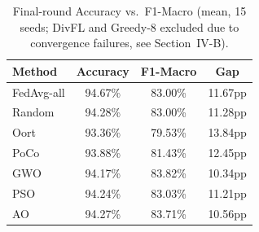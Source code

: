 \documentclass[conference]{IEEEtran}
\begin{document}
\begin{table}[t]
\centering
\caption{Final-round Accuracy vs.\ F1-Macro (mean, 15 seeds; DivFL and Greedy-8 excluded due to convergence failures, see Section~IV-B).}
\label{tab:accf1gap}
\begin{tabular}{lccc}
\toprule
Method & Accuracy & F1-Macro & Gap \\
\midrule
FedAvg-all & 94.67\% & 83.00\% & 11.67pp \\
Random & 94.28\% & 83.00\% & 11.28pp \\
Oort & 93.36\% & 79.53\% & 13.84pp \\
PoCo & 93.88\% & 81.43\% & 12.45pp \\
GWO & 94.17\% & 83.82\% & 10.34pp \\
PSO & 94.24\% & 83.03\% & 11.21pp \\
AO & 94.27\% & 83.71\% & 10.56pp \\
\bottomrule
\end{tabular}
\end{table}
\end{document}
